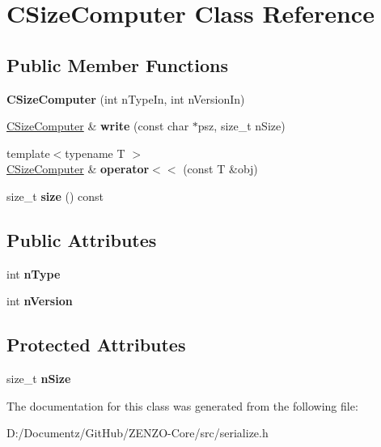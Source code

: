 \hypertarget{class_c_size_computer}{}\section{C\+Size\+Computer Class Reference}
\label{class_c_size_computer}
\subsection*{Public Member Functions}
\begin{DoxyCompactItemize}
\item 
\mbox{\label{class_c_size_computer_a475a1a15be285c38c4b94ad0ab0ce73c}} 
{\bfseries C\+Size\+Computer} (int n\+Type\+In, int n\+Version\+In)
\item 
\mbox{\label{class_c_size_computer_ad4b4f5e37acacf894f60c728e694ee89}} 
\mbox{\hyperlink{class_c_size_computer}{C\+Size\+Computer}} \& {\bfseries write} (const char $\ast$psz, size\+\_\+t n\+Size)
\item 
\mbox{\label{class_c_size_computer_a03a29c76f82dca1559e7922b35bebd0d}} 
{\footnotesize template$<$typename T $>$ }\\\mbox{\hyperlink{class_c_size_computer}{C\+Size\+Computer}} \& {\bfseries operator$<$$<$} (const T \&obj)
\item 
\mbox{\label{class_c_size_computer_a649d670bdcfee2b47a1982af566d3d7d}} 
size\+\_\+t {\bfseries size} () const
\end{DoxyCompactItemize}
\subsection*{Public Attributes}
\begin{DoxyCompactItemize}
\item 
\mbox{\label{class_c_size_computer_a1f166e95dc06a6f3718b2fac9cda18ee}} 
int {\bfseries n\+Type}
\item 
\mbox{\label{class_c_size_computer_a25759db1089e475fcba2f408633dc7bf}} 
int {\bfseries n\+Version}
\end{DoxyCompactItemize}
\subsection*{Protected Attributes}
\begin{DoxyCompactItemize}
\item 
\mbox{\label{class_c_size_computer_a3ea758bb100dd9ce38071e040cd3c597}} 
size\+\_\+t {\bfseries n\+Size}
\end{DoxyCompactItemize}


The documentation for this class was generated from the following file\+:\begin{DoxyCompactItemize}
\item 
D\+:/\+Documentz/\+Git\+Hub/\+Z\+E\+N\+Z\+O-\/\+Core/src/serialize.\+h\end{DoxyCompactItemize}
